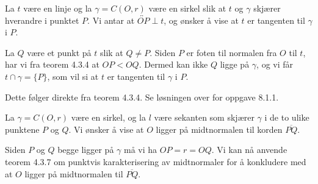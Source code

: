 
\begin{oppgave}[8.1.1]
    La $t$ være en linje og la $\gamma = C(O, r)$ være en sirkel slik at $t$ og $\gamma$ skjærer hverandre i punktet $P$. 
    Vi antar at $\overleftrightarrow{OP}\perp t$, og ønsker å vise at $t$ er tangenten til $\gamma$ i $P$. 

    La $Q$ være et punkt på $t$ slik at $Q\neq P$. 
    Siden $P$ er foten til normalen fra $O$ til $t$, har vi fra teorem 4.3.4 at $OP<OQ$.
    Dermed kan ikke $Q$ ligge på $\gamma$, og vi får $t\cap\gamma = \{P\}$, som vil si at $t$ er tangenten til $\gamma$ i $P$. 
    
    \begin{figure}[H]
        \centering
         
    \end{figure}
\end{oppgave}

\begin{oppgave}[8.1.2]
    Dette følger direkte fra teorem 4.3.4. Se løsningen over for oppgave 8.1.1.
\end{oppgave}

\begin{oppgave}[8.1.3]
    La $\gamma = C(O,r)$ være en sirkel, og la $l$ være sekanten som skjærer $\gamma$ i de to ulike punktene $P$ og $Q$.
    Vi ønsker å vise at $O$ ligger på midtnormalen til korden $\overline{PQ}$. 
    
    Siden $P$ og $Q$ begge ligger på $\gamma$ må vi ha $OP=r=OQ$.
    Vi kan nå anvende teorem 4.3.7 om punktvis karakterisering av midtnormaler for å konkludere med at $O$ ligger på midtnormalen til $\overline{PQ}$.  
\end{oppgave}


